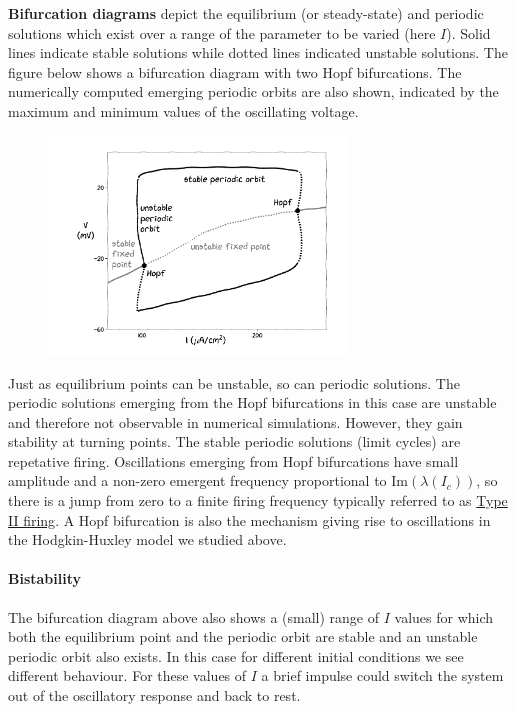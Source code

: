 \documentclass[11pt]{article}
\begin{document}
\textbf{Bifurcation diagrams} depict the equilibrium (or steady-state)
and periodic solutions which exist over a range of the parameter to be
varied (here \(I\)). Solid lines indicate stable solutions while dotted
lines indicated unstable solutions. The figure below shows a bifurcation
diagram with two Hopf bifurcations. The numerically computed emerging
periodic orbits are also shown, indicated by the maximum and minimum
values of the oscillating voltage.

\begin{figure}
  \centering
  \includegraphics[width=8cm]{MLbifdiag.png}
\end{figure}

Just as equilibrium points can be unstable, so can periodic solutions.
The periodic solutions emerging from the Hopf bifurcations in this case
are unstable and therefore not observable in numerical simulations.
However, they gain stability at turning points. The stable periodic
solutions (limit cycles) are repetative firing. Oscillations emerging
from Hopf bifurcations have small amplitude and a non-zero emergent
frequency proportional to \(\mbox{Im}(\lambda(I_c))\), so there is a
jump from zero to a finite firing frequency typically referred to as
\href{https://neuronaldynamics.epfl.ch/online/Ch4.S4.html}{Type II
firing}. A Hopf bifurcation is also the mechanism giving rise to
oscillations in the Hodgkin-Huxley model we studied above.

    \hypertarget{bistability}{%
\paragraph{Bistability}\label{bistability}}

The bifurcation diagram above also shows a (small) range of \(I\) values
for which both the equilibrium point and the periodic orbit are stable
and an unstable periodic orbit also exists. In this case for different
initial conditions we see different behaviour. For these values of \(I\)
a brief impulse could switch the system out of the oscillatory response
and back to rest.
\end{document}
